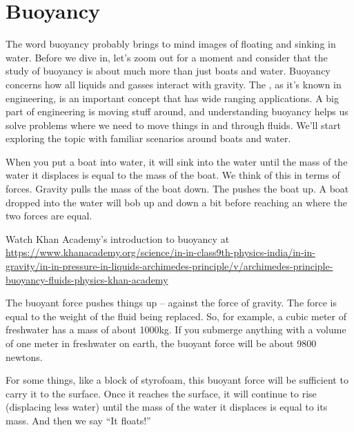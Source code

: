 \chapter{Buoyancy}

The word buoyancy probably brings to mind images of floating and sinking in water. Before we dive in, let's zoom out for a moment and consider that the study of buoyancy is about much more than just boats and water. Buoyancy concerns how all liquids and gasses interact with gravity. The , as it’s known in engineering, is an important concept that has wide ranging applications. A big part of engineering is moving stuff around, and understanding buoyancy helps us solve problems where we need to move things in and through fluids. We’ll start exploring the topic with familiar scenarios around boats and water. 

When you put a boat into water, it will sink into the water until
the mass of the water it displaces is equal to the mass of the
boat. We think of this in terms of forces. Gravity pulls the mass of
the boat down. The  pushes the boat up. A boat
dropped into the water will bob up and down a bit before reaching an
 where the two forces are equal.

Watch Khan Academy's introduction to buoyancy at \url{https://www.khanacademy.org/science/in-in-class9th-physics-india/in-in-gravity/in-in-pressure-in-liquids-archimedes-principle/v/archimedes-principle-buoyancy-fluids-physics-khan-academy}

The buoyant force pushes things up -- against the force of
gravity. The force is equal to the weight of the fluid being
replaced. So, for example, a cubic meter of freshwater has a mass of
about 1000kg.  If you submerge anything with a volume of one meter in
freshwater on earth, the buoyant force will be about 9800 newtons.

For some things, like a block of styrofoam, this buoyant force will be
sufficient to carry it to the surface. Once it reaches the surface, it
will continue to rise (displacing less water) until the mass of the
water it displaces is equal to its mass. And then we say ``It floats!''

